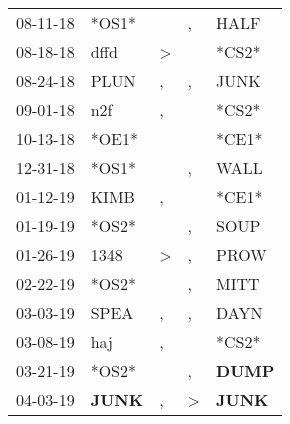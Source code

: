 \begin{supertabular}{p{0.07\textwidth}p{0.06\textwidth}p{0.02\textwidth}p{0.02\textwidth}p{0.06\textwidth}}
          08-11-18\textsuperscript{} &                            *OS1* &                  &                , &           HALF\textsuperscript{} \\
          08-18-18\textsuperscript{} &           dffd\textsuperscript{} &     \textgreater &                  &                            *CS2* \\
          08-24-18\textsuperscript{} &           PLUN\textsuperscript{} &                , &                , &           JUNK\textsuperscript{} \\
          09-01-18\textsuperscript{} &            n2f\textsuperscript{} &                , &                  &                            *CS2* \\
          10-13-18\textsuperscript{} &                            *OE1* &                  &                  &                            *CE1* \\
          12-31-18\textsuperscript{} &                            *OS1* &                  &                , &           WALL\textsuperscript{} \\
          01-12-19\textsuperscript{} &           KIMB\textsuperscript{} &                , &                  &                            *CE1* \\
          01-19-19\textsuperscript{} &                            *OS2* &                  &                , &           SOUP\textsuperscript{} \\
          01-26-19\textsuperscript{} &           1348\textsuperscript{} &     \textgreater &                , &           PROW\textsuperscript{} \\
          02-22-19\textsuperscript{} &                            *OS2* &                  &                , &           MITT\textsuperscript{} \\
          03-03-19\textsuperscript{} &           SPEA\textsuperscript{} &                , &                , &           DAYN\textsuperscript{} \\
          03-08-19\textsuperscript{} &            haj\textsuperscript{} &                , &                  &                            *CS2* \\
          03-21-19\textsuperscript{} &                            *OS2* &                  &                , &  \textbf{DUMP\textsuperscript{}} \\
          04-03-19\textsuperscript{} &  \textbf{JUNK\textsuperscript{}} &                , &     \textgreater &  \textbf{JUNK\textsuperscript{}} \\

\end{supertabular}
